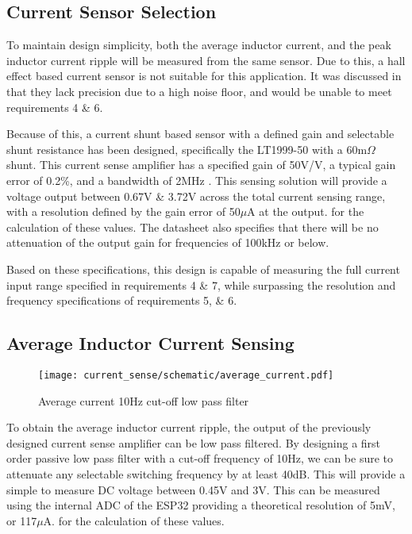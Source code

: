 \subsection{Current Sensor Selection}\label{S:current_sense_selection}

To maintain design simplicity, both the average inductor current, and the peak inductor current ripple will be measured from the same sensor. Due to this, a hall effect based current sensor is not suitable for this application. It was discussed in  that they lack precision due to a high noise floor, and would be unable to meet requirements 4 \& 6. 

Because of this, a current shunt based sensor with a defined gain and selectable shunt resistance has been designed, specifically the LT1999-50 with a 60m$\Omega$ shunt. This current sense amplifier has a specified gain of 50V/V, a typical gain error of 0.2\%, and a bandwidth of 2MHz \cite{LT1999_datasheet}. This sensing solution will provide a voltage output between 0.67V \& 3.72V across the total current sensing range, with a resolution defined by the gain error of 50$\mu$A at the output.   for the calculation of these values. The datasheet also specifies that there will be no attenuation of the output gain for frequencies of 100kHz or below. 

Based on these specifications, this design is capable of measuring the full current input range specified in requirements 4 \& 7, while surpassing the resolution and frequency specifications of requirements 5, \& 6.


\subsection{Average Inductor Current Sensing}\label{S:avg_current_design}

\begin{wrapfigure}{r}{0.3\textwidth}
    \vspace{-33pt}
    \begin{center}
      \texttt{[image: current\_sense/schematic/average\_current.pdf]}
    \end{center}
    \caption{Average current 10Hz cut-off low pass filter}
    \vspace{-22pt}
\end{wrapfigure}

To obtain the average inductor current ripple, the output of the previously designed current sense amplifier can be low pass filtered. By designing a first order passive low pass filter with a cut-off frequency of 10Hz, we can be sure to attenuate any selectable switching frequency by at least 40dB. This will provide a simple to measure DC voltage between 0.45V and 3V. This can be measured using the internal ADC of the ESP32 providing a theoretical resolution of 5mV, or 117$\mu$A.   for the calculation of these values.



